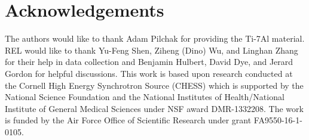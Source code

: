 \documentclass[3p]{elsarticle}
\begin{document}
\section*{Acknowledgements}
	The authors would like to thank Adam Pilchak for providing the Ti-7Al material. REL would like to thank Yu-Feng Shen, Ziheng (Dino) Wu, and Linghan Zhang for their help in data collection and Benjamin Hulbert, David Dye, and Jerard Gordon for helpful discussions. This work is based upon research conducted at the Cornell High Energy Synchrotron Source (CHESS) which is supported by the National Science Foundation and the National Institutes of Health/National Institute of General Medical Sciences under NSF award DMR-1332208. The work is funded by the Air Force Of{}fice of Scientific Research under grant FA9550-16-1-0105.

\newpage
\end{document}
